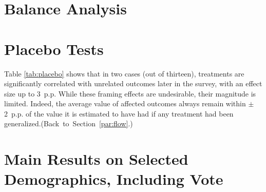 \begin{table}[h!]
    \caption[Treatment effects on attrition (2)]{Treatment effects on attrition (continued). \hfill (Back~to~Section~\ref{par:data_quality}.)} \label{tab:attrition}
    \makebox[\textwidth][c]{\resizebox*{.98\paperwidth}{!}{
        }}
\end{table}

\clearpage
\section{Balance Analysis}\label{app:balance}

\begin{table}[h]
    \caption[Balance analysis]{Balance analysis.} \label{tab:balance}
    \makebox[\textwidth][c]{
\resizebox*{!}{.71\textheight}{ 
        
        }
    }
\end{table}
\clearpage

\section{Placebo Tests}\label{app:placebo}



\begin{table}[!htbp] 
  \caption{Placebo tests of treatments on unrelated outcomes (simple OLS regressions).} \label{tab:placebo} 
  \makebox[\textwidth][c]{}
  Table \ref{tab:placebo} shows that in two cases (out of thirteen), treatments are significantly correlated with unrelated outcomes later in the survey, with an effect size up to 3~p.p. While these framing effects are undesirable, their magnitude is limited. Indeed, the average value of affected outcomes always remain within $\pm$2~p.p. of the value it is estimated to have had if any treatment had been generalized.\hfill (Back~to~Section~\ref{par:flow}.)
\end{table} 


\clearpage
\section{Main Results on Selected Demographics, Including Vote}\label{app:pol}

